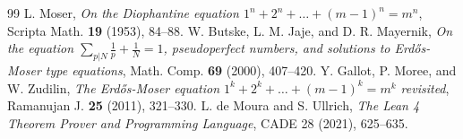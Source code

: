 \documentclass[11pt,a4paper]{article}
\theoremstyle{definition}
\begin{document}
\begin{thebibliography}{99}
 L. Moser, \textit{On the Diophantine equation $1^n + 2^n + \dots + (m-1)^n = m^n$}, Scripta Math. \textbf{19} (1953), 84--88.
 W. Butske, L. M. Jaje, and D. R. Mayernik, \textit{On the equation $\sum_{p|N} \frac{1}{p} + \frac{1}{N} = 1$, pseudoperfect numbers, and solutions to Erd\H{o}s-Moser type equations}, Math. Comp. \textbf{69} (2000), 407--420.
 Y. Gallot, P. Moree, and W. Zudilin, \textit{The Erd\H{o}s-Moser equation $1^k + 2^k + \dots + (m-1)^k = m^k$ revisited}, Ramanujan J. \textbf{25} (2011), 321--330.
 L. de Moura and S. Ullrich, \textit{The Lean 4 Theorem Prover and Programming Language}, CADE 28 (2021), 625--635.
\end{thebibliography}
\end{document}
